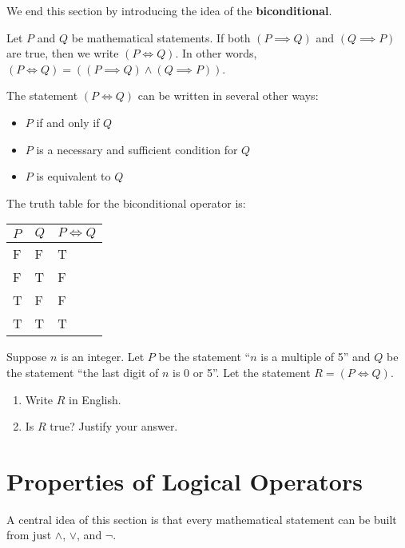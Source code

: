 We end this section by introducing the idea of the \textbf{biconditional}.
\begin{definition}
    Let $P$ and $Q$ be mathematical statements. If both $(P \implies Q)$ and $(Q \implies P)$ are true, then we write $(P \iff Q)$. In other words, $(P \iff Q) = ((P \implies Q) \land (Q \implies P))$.
\end{definition}
\begin{remark}
    The statement $(P \iff Q)$ can be written in several other ways:
    \begin{itemize}
        \item $P$ if and only if $Q$
        \item $P$ is a necessary and sufficient condition for $Q$
        \item $P$ is equivalent to $Q$
    \end{itemize}
\end{remark}

The truth table for the biconditional operator is:
\begin{table}[h]
    \centering
    \begin{tabular}{|l|l||l|}
        \hline
        $P$ & $Q$ & $P\iff Q$ \\ \hline
        F   & F   & T         \\ \hline
        F   & T   & F         \\ \hline
        T   & F   & F         \\ \hline
        T   & T   & T         \\ \hline
    \end{tabular}
\end{table}

\begin{exercise}
    Suppose $n$ is an integer. Let $P$ be the statement ``$n$ is a multiple of 5'' and $Q$ be the statement ``the last digit of $n$ is 0 or 5''. Let the statement $R = (P \iff Q)$.
    \begin{enumerate}[label=(\roman*)]
        \item Write $R$ in English.
        \item Is $R$ true? Justify your answer.
    \end{enumerate}
\end{exercise}

\section{Properties of Logical Operators}
A central idea of this section is that every mathematical statement can be built from just $\land$, $\lor$, and $\lnot$.

